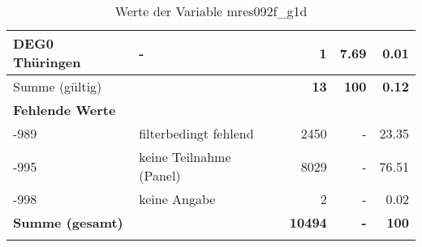 \begin{longtable}{Xlrrr}
     \multicolumn{1}{X}{DEG0 Thüringen} &
     - &
     \num{1} &
     \num[round-mode=places,round-precision=2]{7.69} &
     \num[round-mode=places,round-precision=2]{0.01} \\
     \midrule
      \multicolumn{2}{l}{Summe (gültig)} & \textbf{\num{13}} &
      \textbf{\num{100}} &
         \textbf{\num[round-mode=places,round-precision=2]{0.12}} \\
     \multicolumn{5}{l}{\textbf{Fehlende Werte}}\\
       -989 & filterbedingt fehlend & \num{2450} & - & \num[round-mode=places,round-precision=2]{23.35} \\

       -995 & keine Teilnahme (Panel) & \num{8029} & - & \num[round-mode=places,round-precision=2]{76.51} \\

       -998 & keine Angabe & \num{2} & - & \num[round-mode=places,round-precision=2]{0.02} \\

     \midrule
     \multicolumn{2}{l}{\textbf{Summe (gesamt)}} & \textbf{\num{10494}} & \textbf{-} & \textbf{\num{100}} \\
     \bottomrule
     \caption{Werte der Variable mres092f\_g1d}
     \end{longtable}
     
